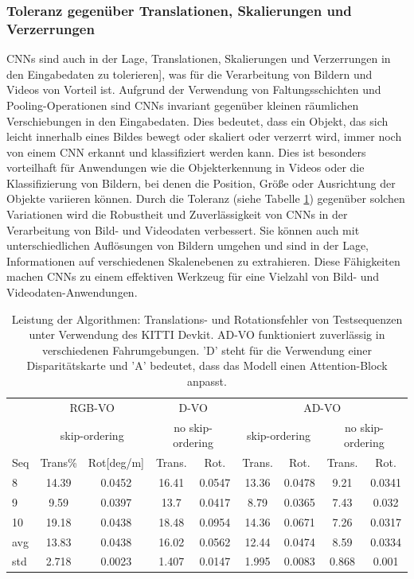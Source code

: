 \subsubsection{Toleranz gegenüber Translationen, Skalierungen und Verzerrungen}

    \acp{CNN} sind auch in der Lage, Translationen, Skalierungen und Verzerrungen in den Eingabedaten zu tolerieren], was für die Verarbeitung von Bildern und Videos von Vorteil ist. 
    Aufgrund der Verwendung von Faltungsschichten und Pooling-Operationen sind \acp{CNN} invariant gegenüber kleinen räumlichen Verschiebungen in den Eingabedaten. 
    Dies bedeutet, dass ein Objekt, das sich leicht innerhalb eines Bildes bewegt oder skaliert oder verzerrt wird, immer noch von einem CNN erkannt und klassifiziert werden kann. 
    Dies ist besonders vorteilhaft für Anwendungen wie die Objekterkennung in Videos oder die Klassifizierung von Bildern, bei denen die Position, Größe oder Ausrichtung der Objekte variieren können.
    Durch die Toleranz (siehe Tabelle \ref{tab:KITTY_vergleich}) gegenüber solchen Variationen wird die Robustheit und Zuverlässigkeit von \acp{CNN} in der Verarbeitung von Bild- und Videodaten verbessert. 
    Sie können auch mit unterschiedlichen Auflösungen von Bildern umgehen und sind in der Lage, Informationen auf verschiedenen Skalenebenen zu extrahieren.
    Diese Fähigkeiten machen \acp{CNN} zu einem effektiven Werkzeug für eine Vielzahl von Bild- und Videodaten-Anwendungen.

    \begin{table}[h]
        \centering
        \begin{tabular}{lcccccccc}
             & \multicolumn{2}{c}{RGB-VO} & \multicolumn{2}{c}{D-VO} & \multicolumn{4}{c}{AD-VO} \\
             & \multicolumn{2}{c}{skip-ordering} & \multicolumn{2}{c}{no skip-ordering} & \multicolumn{2}{c}{skip-ordering} & \multicolumn{2}{c}{no skip-ordering} \\
            Seq & Trans\% & Rot[deg/m] & Trans. & Rot. & Trans. & Rot. & Trans. & Rot. \\
            8 & 14.39 & 0.0452 & 16.41 & 0.0547 & 13.36 & 0.0478 & 9.21 & 0.0341 \\
            9 & 9.59 & 0.0397 & 13.7 & 0.0417 & 8.79 & 0.0365 & 7.43 & 0.032 \\
            10 & 19.18 & 0.0438 & 18.48 & 0.0954 & 14.36 & 0.0671 & 7.26 & 0.0317 \\
            avg & 13.83 & 0.0438 & 16.02 & 0.0562 & 12.44 & 0.0474 & 8.59 & 0.0334 \\
            std & 2.718 & 0.0023 & 1.407 & 0.0147 & 1.995 & 0.0083 & 0.868 & 0.001 \\
        \end{tabular}
        \caption{Leistung der Algorithmen: Translations- und Rotationsfehler von Testsequenzen unter Verwendung des KITTI Devkit. AD-VO funktioniert zuverlässig in verschiedenen Fahrumgebungen. 'D' steht für die Verwendung einer Disparitätskarte und 'A' bedeutet, dass das Modell einen Attention-Block anpasst.}
        \label{tab:KITTY_vergleich}
    \end{table}
    
